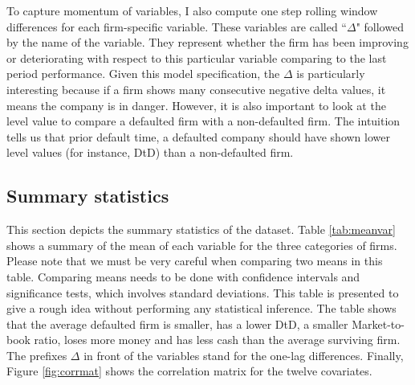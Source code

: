 To capture momentum of variables, I also compute one step rolling window differences for each firm-specific variable. These variables are called ``$\Delta$" followed by the name of the variable. They represent whether the firm has been improving or deteriorating with respect to this particular variable comparing to the last period performance. Given this model specification, the $\Delta$ is particularly interesting because if a firm shows many consecutive negative delta values, it means the company is in danger. However, it is also important to look at the level value to compare a defaulted firm with a non-defaulted firm. The intuition tells us that prior default time, a defaulted company should have shown lower level values (for instance, DtD) than a non-defaulted firm.

\subsection{Summary statistics}
\label{sec3-2}

This section depicts the summary statistics of the dataset. Table \ref{tab:meanvar} shows a summary of the mean of each variable for the three categories of firms. Please note that we must be very careful when comparing two means in this table. Comparing means needs to be done with confidence intervals and significance tests, which involves standard deviations. This table is presented to give a rough idea without performing any statistical inference. The table shows that the average defaulted firm is smaller, has a lower DtD, a smaller Market-to-book ratio, loses more money and has less cash than the average surviving firm. The prefixes $\Delta$ in front of the variables stand for the one-lag differences. Finally, Figure \ref{fig:corrmat} shows the correlation matrix for the twelve covariates.

